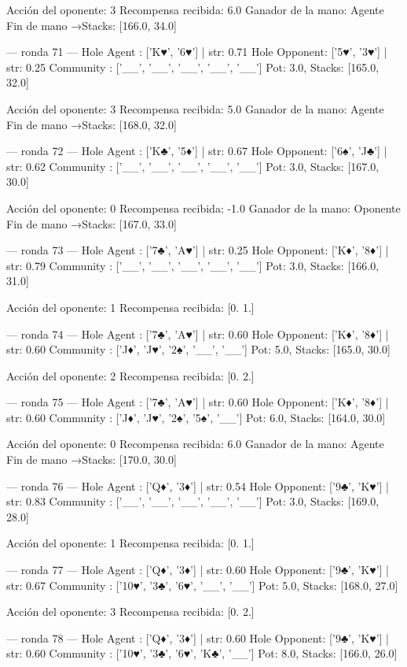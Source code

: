 Acción del oponente: 3
Recompensa recibida: 6.0
Ganador de la mano: Agente
Fin de mano →Stacks: [166.0, 34.0]


--- ronda 71 ---
Hole Agent : ['K♥', '6♥'] | str: 0.71
Hole Opponent: ['5♥', '3♥'] | str: 0.25
Community  : ['__', '__', '__', '__', '__']
Pot: 3.0, Stacks: [165.0, 32.0]

Acción del oponente: 3
Recompensa recibida: 5.0
Ganador de la mano: Agente
Fin de mano →Stacks: [168.0, 32.0]


--- ronda 72 ---
Hole Agent : ['K♣', '5♦'] | str: 0.67
Hole Opponent: ['6♠', 'J♣'] | str: 0.62
Community  : ['__', '__', '__', '__', '__']
Pot: 3.0, Stacks: [167.0, 30.0]

Acción del oponente: 0
Recompensa recibida: -1.0
Ganador de la mano: Oponente
Fin de mano →Stacks: [167.0, 33.0]


--- ronda 73 ---
Hole Agent : ['7♣', 'A♥'] | str: 0.25
Hole Opponent: ['K♦', '8♦'] | str: 0.79
Community  : ['__', '__', '__', '__', '__']
Pot: 3.0, Stacks: [166.0, 31.0]

Acción del oponente: 1
Recompensa recibida: [0. 1.]

--- ronda 74 ---
Hole Agent : ['7♣', 'A♥'] | str: 0.60
Hole Opponent: ['K♦', '8♦'] | str: 0.60
Community  : ['J♦', 'J♥', '2♠', '__', '__']
Pot: 5.0, Stacks: [165.0, 30.0]

Acción del oponente: 2
Recompensa recibida: [0. 2.]

--- ronda 75 ---
Hole Agent : ['7♣', 'A♥'] | str: 0.60
Hole Opponent: ['K♦', '8♦'] | str: 0.60
Community  : ['J♦', 'J♥', '2♠', '5♠', '__']
Pot: 6.0, Stacks: [164.0, 30.0]

Acción del oponente: 0
Recompensa recibida: 6.0
Ganador de la mano: Agente
Fin de mano →Stacks: [170.0, 30.0]


--- ronda 76 ---
Hole Agent : ['Q♦', '3♦'] | str: 0.54
Hole Opponent: ['9♣', 'K♥'] | str: 0.83
Community  : ['__', '__', '__', '__', '__']
Pot: 3.0, Stacks: [169.0, 28.0]

Acción del oponente: 1
Recompensa recibida: [0. 1.]

--- ronda 77 ---
Hole Agent : ['Q♦', '3♦'] | str: 0.60
Hole Opponent: ['9♣', 'K♥'] | str: 0.67
Community  : ['10♥', '3♣', '6♥', '__', '__']
Pot: 5.0, Stacks: [168.0, 27.0]

Acción del oponente: 3
Recompensa recibida: [0. 2.]

--- ronda 78 ---
Hole Agent : ['Q♦', '3♦'] | str: 0.60
Hole Opponent: ['9♣', 'K♥'] | str: 0.60
Community  : ['10♥', '3♣', '6♥', 'K♣', '__']
Pot: 8.0, Stacks: [166.0, 26.0]

